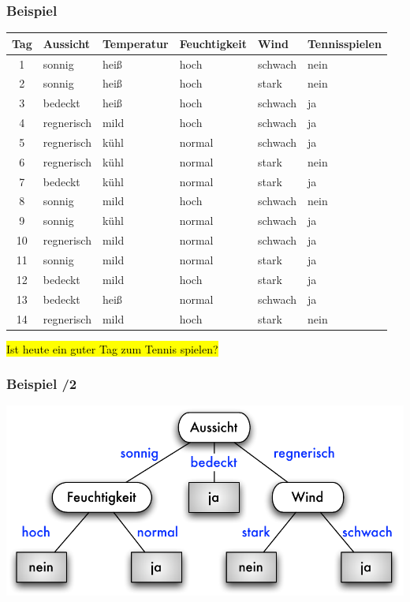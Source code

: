 \begin{frame}[shrink]
\frametitle{Beispiel}

\begin{center}
{\footnotesize\begin{tabular}{|c|l|l|l|l|l|}
\hline
Tag & Aussicht & Temperatur & Feuchtigkeit & Wind & Tennisspielen \\
\hline\hline
1 & sonnig & heiß & hoch & schwach & nein \\ \hline
2 & sonnig & heiß & hoch & stark & nein \\ \hline
3 & bedeckt & heiß & hoch & schwach & ja \\ \hline
4 & regnerisch & mild & hoch & schwach & ja \\ \hline
5 & regnerisch & kühl & normal & schwach & ja \\ \hline
6 & regnerisch &  kühl & normal & stark & nein \\ \hline
7 & bedeckt & kühl & normal & stark & ja \\ \hline
8 & sonnig &  mild & hoch & schwach & nein \\ \hline
9 & sonnig & kühl & normal & schwach & ja \\ \hline
10 & regnerisch & mild & normal & schwach & ja \\ \hline
11 & sonnig & mild & normal & stark & ja \\ \hline
12 & bedeckt & mild & hoch & stark & ja \\ \hline
13 & bedeckt & heiß & normal & schwach & ja \\ \hline
14 & regnerisch & mild & hoch & stark & nein \\ \hline
\end{tabular}}

\vspace*{1em}
\hl{Ist heute ein guter Tag zum Tennis spielen?}
\end{center}

\end{frame}


\begin{frame}
\frametitle{Beispiel /2}

\begin{center}
\includegraphics[scale=.7]{fig7/entscheidungsbaum-tennis.pdf}
\end{center}

\end{frame}

